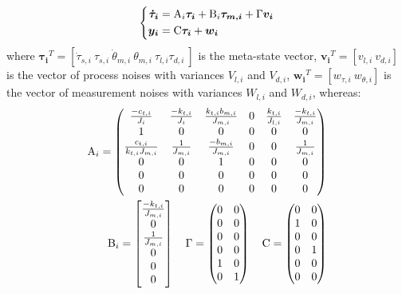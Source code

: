 \documentclass[journal]{IEEEtran}
\newcommand{\vectmm}[1]{ {#1 }}
\newcommand{\vectm}[1]{ { {\text #1} }}
\newcommand{\vects}[1]{{\boldsymbol {#1}}}
\newcommand{\vectlong}[1]{  \begin{bmatrix} #1 \end{bmatrix} }
\newcommand{\mat}[1]{  \begin{pmatrix} #1 \end{pmatrix} }
\begin{document}
\begin{equation}
\left \{
\begin{aligned}
\vects{\dot{\tau}_i} &=\vectm{A_i}\vects{\tau_i}+\vectm{B_i}\vects{\tau_{m,i}}+\vectmm{\Gamma}\vects{v_i} \\
		\vects{y_i} &=\vectm{C}\vects{\tau_i}+\vects{w_i}
		\end{aligned}
		\right .
		\label{eq:metasystem}
		\end{equation}
		where $\vects{\tau_i}^T=[ \dot{\tau}_{s,i}\ \tau_{s,i}\ \dot{\theta}_{m,i}\ \theta_{m,i}\  \tau_{l,i} \tau_{d,i}\ ]$ is the meta-state vector, $\vects{v_i}^T=[ v_{l,i}\ v_{d,i} ]$ is the vector of process noises with variances $V_{l,i}$ and $V_{d,i}$, $\vects{w_i}^T=[ w_{\tau,i}\ w_{\theta,i} ]$ is the vector of measurement noises with variances $W_{l,i}$ and $W_{d,i}$, whereas:
		\begin{equation}
		\begin{aligned}
		\vectm{A_i}=\mat{ \frac{-c_{t,i}}{J_i}  & \frac{-k_{t,i}}{J_i}& \frac{k_{t,i}b_{m,i}}{J_{m,i}} & 0 & \frac{ k_{t,i}}{J_{l,i}} &  \frac{-k_{t,i}}{J_{m,i}} \\
			1 & 0 & 0 & 0 & 0 & 0\\
			\frac{c_{t,i}}{  k_{t,i} J_{m,i} }&  \frac{1}{J_{m,i}} &  \frac{ -b_{m,i}}{J_{m,i}} & 0 & 0 &  \frac{1}{J_{m,i}}\\
			0 & 0 & 1 & 0 & 0 & 0\\
			0 & 0 & 0 & 0 & 0 & 0\\
			0 & 0 & 0 & 0 & 0 & 0} \\
		\vectm{B_i}=\vectlong{ \frac{ -k_{t,i}}{J_{m,i}} \\ 0 \\ \frac{1}{J_{m,i}} \\ 0 \\ 0 \\ 0}  \quad
		\vectmm{\Gamma}=\mat{ 0 & 0 \\ 0 & 0 \\ 0 & 0 \\ 0 & 0 \\ 1 & 0 \\ 0 & 1} \quad
		\vectm{C}=\mat{0 & 0 \\  1 & 0 \\  0 & 0  \\
			0 & 1 \\  0 & 0 \\ 0 & 0 } 
		\end{aligned}
		\label{stateobserver}
		\end{equation}
\end{document}
